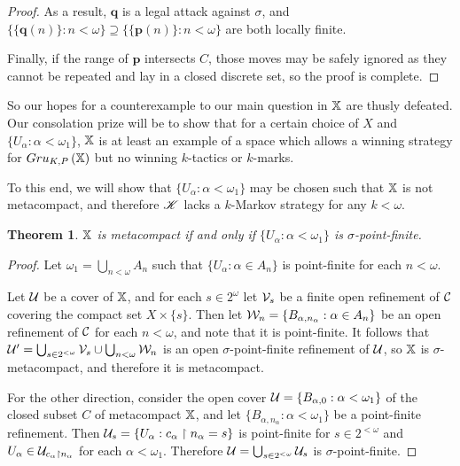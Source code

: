 \documentclass{amsart}
\newtheorem{theorem}{Theorem}[section]
\theoremstyle{definition}
\begin{document}
\begin{proof}
  As a result, $\pmb q$ is a legal attack against $\sigma$, and
  $\{\{\pmb q(n)\}:n<\omega\}\supseteq\{\{\pmb p(n)\}:n<\omega\}$ are
  both locally finite.

  Finally, if the range of $\pmb p$ intersects $C$, those moves may be safely
  ignored as they cannot be repeated and lay in a closed discrete set,
  so the proof is complete.
\end{proof}

So our hopes for a counterexample to our main question
in $\mathbb{X}$ are thusly defeated. Our
consolation prize will be to show that for a certain choice of $X$
and $\{U_\alpha:\alpha<\omega_1\}$, $\mathbb{X}$ is at least
an example of a space which allows a winning strategy for $Gru_{K,P}\left({\mathbb{X}}\right)$
but no winning $k$-tactics or $k$-marks.

To this end, we will show that $\{U_\alpha:\alpha<\omega_1\}$ may be chosen
such that $\mathbb{X}$ is not metacompact, and therefore
$\mathscr{K}$ lacks a $k$-Markov strategy for any $k<\omega$.

\begin{theorem}
  $\mathbb{X}$ is metacompact
    if and only if
  $\{U_\alpha:\alpha<\omega_1\}$ is $\sigma$-point-finite.
\end{theorem}

\begin{proof}
  Let $\omega_1=\bigcup_{n<\omega}A_n$ such that
  $\{U_\alpha:\alpha\in A_n\}$ is point-finite for each $n<\omega$.

  Let $\mathcal{U}$ be a cover of $\mathbb{X}$, and for each $s\in 2^\omega$
  let $\mathcal{V}_s$ be a finite open refinement of $\mathcal{C}$ covering the compact
  set $X\times\{s\}$. Then let $\mathcal{W}_n = \{B_{\alpha,n_\alpha}:\alpha\in A_n\}$
  be an open refinement of $\mathcal{C}$ for each $n<\omega$, and note that it
  is point-finite. It follows that
  $\mathcal{U}' = \bigcup_{s\in 2^{<\omega}} \mathcal{V}_s \cup \bigcup_{n<\omega} \mathcal{W}_n$
  is an open $\sigma$-point-finite refinement of $\mathcal{U}$, so $\mathbb{X}$
  is $\sigma$-metacompact, and therefore it is metacompact.

  For the other direction, consider the open cover
  $\mathcal{U} = \{B_{\alpha,0}:\alpha<\omega_1\}$ of the closed subset $C$ of
  metacompact $\mathbb{X}$, and let $\{B_{\alpha,n_\alpha}:\alpha<\omega_1\}$ be
  a point-finite refinement. Then
  $\mathcal{U}_s = \{ U_\alpha : c_\alpha \restriction n_\alpha = s\}$ is
  point-finite for $s\in 2^{<\omega}$ and
  $U_\alpha\in\mathcal{U}_{c_\alpha\restriction n_\alpha}$ for each $\alpha<\omega_1$.
  Therefore $\mathcal{U} = \bigcup_{s\in 2^{<\omega}} \mathcal{U}_s$ is
  $\sigma$-point-finite.
\end{proof}
\end{document}
